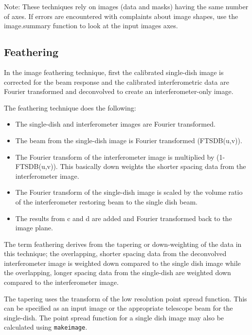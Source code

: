 Note: These techniques rely on images (data and masks) having the same
number of axes. If errors are encountered with complaints about image
shapes, use the image.summary function to look at the input images
axes.


\subsection{Feathering}
\label{section:imtool.SDcombo.feather}

In the image feathering technique, first the calibrated single-dish
image is corrected for the beam response and the calibrated
interferometric data are Fourier transformed and deconvolved to create
an interferometer-only image.

The feathering technique does the following:

\begin{itemize}
\item The single-dish and interferometer images are Fourier
      transformed.
\item The beam from the single-dish image is Fourier transformed
      (FTSDB(u,v)).
\item The Fourier transform of the interferometer image is multiplied
      by (1-FTSDB(u,v)).  This basically down weights the shorter
      spacing data from the interferometer image.
\item The Fourier transform of the single-dish image is scaled by the
      volume ratio of the interferometer restoring beam to the single
      dish beam.
\item The results from c and d are added and Fourier transformed
      back to the image plane.
\end{itemize}

The term feathering derives from the tapering or down-weighting of the
data in this technique; the overlapping, shorter spacing data from the
deconvolved interferometer image is weighted down compared to the
single dish image while the overlapping, longer spacing data from the
single-dish are weighted down compared to the interferometer image.

The tapering uses the transform of the low resolution point spread
function. This can be specified as an input image or the appropriate
telescope beam for the single-dish.  The point spread function for a
single dish image may also be calculated using {\tt makeimage}.

